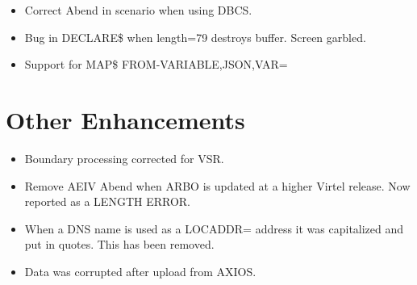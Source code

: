 \documentclass[letterpaper,10pt,english]{sphinxmanual}
\begin{document}
\begin{itemize}
\item {} 
Correct Abend in scenario when using DBCS.

\end{itemize}

\begin{itemize}
\item {} 
Bug in DECLARE\$ when length=79 destroys buffer. Screen garbled.

\end{itemize}

\begin{itemize}
\item {} 
Support for MAP\$ FROM-VARIABLE,JSON,VAR=

\end{itemize}

\newpage


\section{Other Enhancements}
\label{\detokenize{TN202303:other-enhancements}}
\begin{itemize}
\item {} 
Boundary processing corrected for VSR.

\end{itemize}

\begin{itemize}
\item {} 
Remove AEIV Abend when ARBO is updated at a higher Virtel release. Now reported as a LENGTH ERROR.

\end{itemize}

\begin{itemize}
\item {} 
When a DNS name is used as a LOCADDR= address it was capitalized and put in quotes. This has been removed.

\end{itemize}

\begin{itemize}
\item {} 
Data was corrupted after upload from AXIOS.

\end{itemize}
\end{document}
